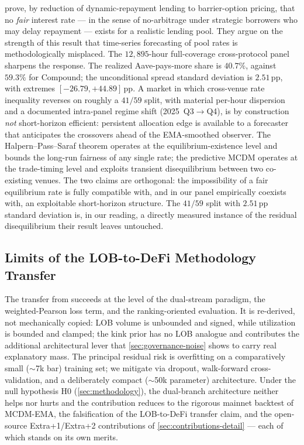 \cite{halpern2024fairrates} prove, by reduction of dynamic-repayment
lending to barrier-option pricing, that no \emph{fair} interest rate
--- in the sense of no-arbitrage under strategic borrowers who may
delay repayment --- exists for a realistic lending pool. They argue
on the strength of this result that time-series forecasting of pool
rates is methodologically misplaced. The $12{,}895$-hour
full-coverage cross-protocol panel sharpens the response. The
realized Aave-pays-more share is $40.7\%$, against $59.3\%$ for
Compound; the unconditional spread standard deviation is $2.51$\,pp,
with extremes $[-26.79, +44.89]$\,pp. A market in which cross-venue
rate inequality reverses on roughly a $41/59$ split, with material
per-hour dispersion and a documented intra-panel regime shift
(2025~Q3$\to$Q4), is by construction \emph{not} short-horizon
efficient: persistent allocation edge is available to a forecaster
that anticipates the crossovers ahead of the EMA-smoothed observer.
The Halpern--Pass--Saraf theorem operates at the equilibrium-existence
level and bounds the long-run fairness of any single rate; the
predictive MCDM operates at the trade-timing level and exploits
transient disequilibrium between two co-existing venues. The two
claims are orthogonal: the impossibility of a fair equilibrium rate
is fully compatible with, and in our panel empirically coexists with,
an exploitable short-horizon structure. The $41/59$ split with
$2.51$\,pp standard deviation is, in our reading, a directly measured
instance of the residual disequilibrium their result leaves
untouched.

\subsection{Limits of the LOB-to-DeFi Methodology Transfer}
\label{sec:transfer}

The transfer from \cite{solovev2026lob} succeeds at the level of the
dual-stream paradigm, the weighted-Pearson loss term, and the
ranking-oriented evaluation. It is re-derived, not mechanically
copied: LOB volume is unbounded and signed, while utilization is
bounded and clamped; the kink prior has no LOB analogue and
contributes the additional architectural lever that
\cref{sec:governance-noise} shows to carry real explanatory mass.
The principal residual risk is overfitting on a comparatively small
($\sim$7k bar) training set; we mitigate via dropout, walk-forward
cross-validation, and a deliberately compact ($\sim$50k parameter)
architecture. Under the null hypothesis H0
(\cref{sec:methodology}), the dual-branch architecture neither helps
nor hurts and the contribution reduces to the rigorous mainnet
backtest of MCDM-EMA, the falsification of the LOB-to-DeFi transfer
claim, and the open-source Extra+1/Extra+2 contributions of
\cref{sec:contributions-detail} --- each of which stands on its own
merits.

